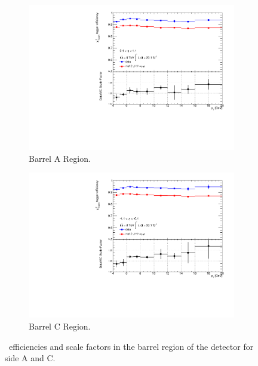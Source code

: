 \begin{figure}[htbp]
  \centering
    \begin{subfigure}[b]{0.85\textwidth}
        \includegraphics[width=\textwidth]{PartCalibration2012/Plots/SFPlots/Barrel_A_smt.pdf}
        \caption{Barrel A Region.}\label{fig:CalibrationScaleFactorBarrelA}
    \end{subfigure}
    
    \begin{subfigure}[b]{0.85\textwidth}
        \includegraphics[width=\textwidth]{PartCalibration2012/Plots/SFPlots/Barrel_C_smt.pdf}
        \caption{Barrel C Region.}\label{fig:CalibrationScaleFactorBarrelC}
    \end{subfigure}
    \caption[\xsm\ efficiencies and scale factors in the barrel region of the detector for side A and C.]{\xsm\ efficiencies and scale factors in the barrel region of the detector for side  A and  C.}\label{fig:CalibrationScaleFactorBarrel}
\end{figure}

